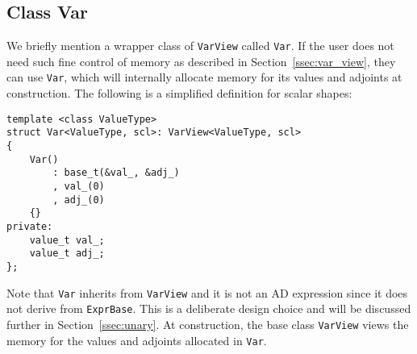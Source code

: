 \subsection{Class Var}

We briefly mention a wrapper class of \verb|VarView| called \verb|Var|.
If the user does not need such fine control of memory as described in Section~\ref{ssec:var_view},
they can use \verb|Var|, which will internally allocate memory for its values and adjoints at construction.
The following is a simplified definition for scalar shapes:
\begin{lstlisting}[style=customcpp]
template <class ValueType>
struct Var<ValueType, scl>: VarView<ValueType, scl>
{
    Var()
        : base_t(&val_, &adj_) 
        , val_(0)
        , adj_(0)
    {}
private:
    value_t val_;
    value_t adj_;
};
\end{lstlisting}
Note that \verb|Var| inherits from \verb|VarView| and 
it is not an AD expression since it does not derive from \verb|ExprBase|.
This is a deliberate design choice and will be discussed further in Section~\ref{ssec:unary}.
At construction, the base class \verb|VarView| 
views the memory for the values and adjoints allocated in \verb|Var|.
